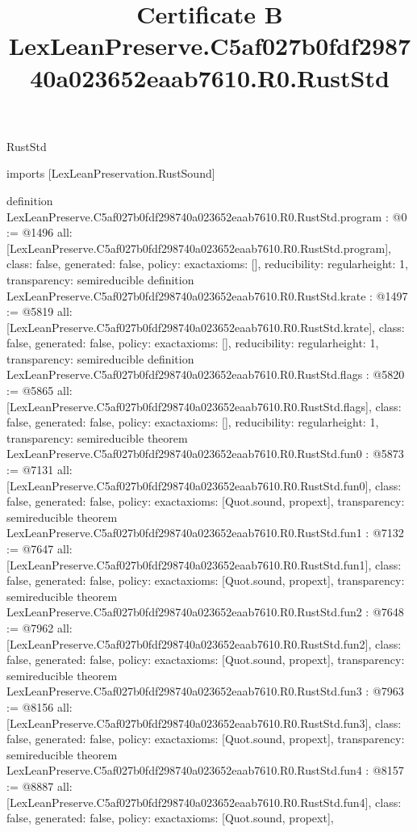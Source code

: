 \begin{lexlean}{RustStd}
\title{Certificate B LexLeanPreserve.C5af027b0fdf298740a023652eaab7610.R0.RustStd}
\begin{coremodule}
imports [LexLeanPreservation.RustSound]

definition LexLeanPreserve.C5af027b0fdf298740a023652eaab7610.R0.RustStd.program : @0 := @1496 {
  all: [LexLeanPreserve.C5af027b0fdf298740a023652eaab7610.R0.RustStd.program],
  class: false,
  generated: false,
  policy: exact{axioms: []},
  reducibility: regular{height: 1},
  transparency: semireducible
}
definition LexLeanPreserve.C5af027b0fdf298740a023652eaab7610.R0.RustStd.krate : @1497 := @5819 {
  all: [LexLeanPreserve.C5af027b0fdf298740a023652eaab7610.R0.RustStd.krate],
  class: false,
  generated: false,
  policy: exact{axioms: []},
  reducibility: regular{height: 1},
  transparency: semireducible
}
definition LexLeanPreserve.C5af027b0fdf298740a023652eaab7610.R0.RustStd.flags : @5820 := @5865 {
  all: [LexLeanPreserve.C5af027b0fdf298740a023652eaab7610.R0.RustStd.flags],
  class: false,
  generated: false,
  policy: exact{axioms: []},
  reducibility: regular{height: 1},
  transparency: semireducible
}
theorem LexLeanPreserve.C5af027b0fdf298740a023652eaab7610.R0.RustStd.fun0 : @5873 := @7131 {
  all: [LexLeanPreserve.C5af027b0fdf298740a023652eaab7610.R0.RustStd.fun0],
  class: false,
  generated: false,
  policy: exact{axioms: [Quot.sound, propext]},
  transparency: semireducible
}
theorem LexLeanPreserve.C5af027b0fdf298740a023652eaab7610.R0.RustStd.fun1 : @7132 := @7647 {
  all: [LexLeanPreserve.C5af027b0fdf298740a023652eaab7610.R0.RustStd.fun1],
  class: false,
  generated: false,
  policy: exact{axioms: [Quot.sound, propext]},
  transparency: semireducible
}
theorem LexLeanPreserve.C5af027b0fdf298740a023652eaab7610.R0.RustStd.fun2 : @7648 := @7962 {
  all: [LexLeanPreserve.C5af027b0fdf298740a023652eaab7610.R0.RustStd.fun2],
  class: false,
  generated: false,
  policy: exact{axioms: [Quot.sound, propext]},
  transparency: semireducible
}
theorem LexLeanPreserve.C5af027b0fdf298740a023652eaab7610.R0.RustStd.fun3 : @7963 := @8156 {
  all: [LexLeanPreserve.C5af027b0fdf298740a023652eaab7610.R0.RustStd.fun3],
  class: false,
  generated: false,
  policy: exact{axioms: [Quot.sound, propext]},
  transparency: semireducible
}
theorem LexLeanPreserve.C5af027b0fdf298740a023652eaab7610.R0.RustStd.fun4 : @8157 := @8887 {
  all: [LexLeanPreserve.C5af027b0fdf298740a023652eaab7610.R0.RustStd.fun4],
  class: false,
  generated: false,
  policy: exact{axioms: [Quot.sound, propext]},
}
\end{coremodule}
\end{lexlean}
